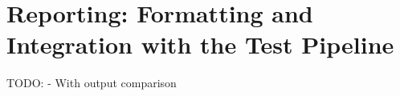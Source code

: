 \section{Reporting: Formatting and Integration with the Test Pipeline} %


\begin{justify}
TODO:
- With output comparison
\end{justify}






